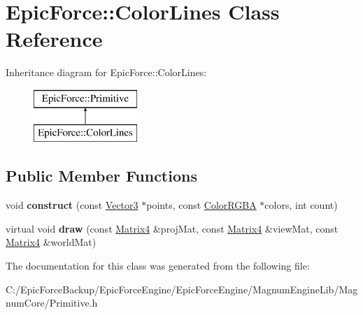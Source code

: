 \hypertarget{class_epic_force_1_1_color_lines}{}\section{Epic\+Force\+:\+:Color\+Lines Class Reference}
\label{class_epic_force_1_1_color_lines}
Inheritance diagram for Epic\+Force\+:\+:Color\+Lines\+:\begin{figure}[H]
\begin{center}
\leavevmode
\includegraphics[height=2.000000cm]{class_epic_force_1_1_color_lines}
\end{center}
\end{figure}
\subsection*{Public Member Functions}
\begin{DoxyCompactItemize}
\item 
void {\bfseries construct} (const \hyperlink{class_magnum_1_1_vector3}{Vector3} $\ast$points, const \hyperlink{class_magnum_1_1_color_r_g_b_a}{Color\+R\+G\+BA} $\ast$colors, int count)\hypertarget{class_epic_force_1_1_color_lines_a5c10e3a5a3d30f6de4586a57a700c04e}{}\label{class_epic_force_1_1_color_lines_a5c10e3a5a3d30f6de4586a57a700c04e}

\item 
virtual void {\bfseries draw} (const \hyperlink{class_magnum_1_1_matrix4}{Matrix4} \&proj\+Mat, const \hyperlink{class_magnum_1_1_matrix4}{Matrix4} \&view\+Mat, const \hyperlink{class_magnum_1_1_matrix4}{Matrix4} \&world\+Mat)\hypertarget{class_epic_force_1_1_color_lines_abaa95dafb0d127a8ec25787bcf0d3406}{}\label{class_epic_force_1_1_color_lines_abaa95dafb0d127a8ec25787bcf0d3406}

\end{DoxyCompactItemize}


The documentation for this class was generated from the following file\+:\begin{DoxyCompactItemize}
\item 
C\+:/\+Epic\+Force\+Backup/\+Epic\+Force\+Engine/\+Epic\+Force\+Engine/\+Magnum\+Engine\+Lib/\+Magnum\+Core/Primitive.\+h\end{DoxyCompactItemize}
